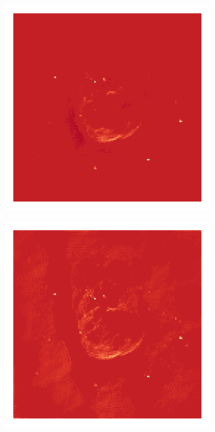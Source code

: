 \begin{figure}[h]
	\begin{subfigure}[b]{0.3\linewidth}
		\includegraphics[width=\linewidth, trim={18px 19px 18px 18px}, clip]{./chapters/05.results/g55/clean_model.png}
	\end{subfigure}
	\begin{subfigure}[b]{0.3\linewidth}
		\includegraphics[width=\linewidth, trim={18px 19px 18px 18px}, clip]{./chapters/05.results/g55/positive_deconv_model.png}

\end{subfigure}
\end{figure}
